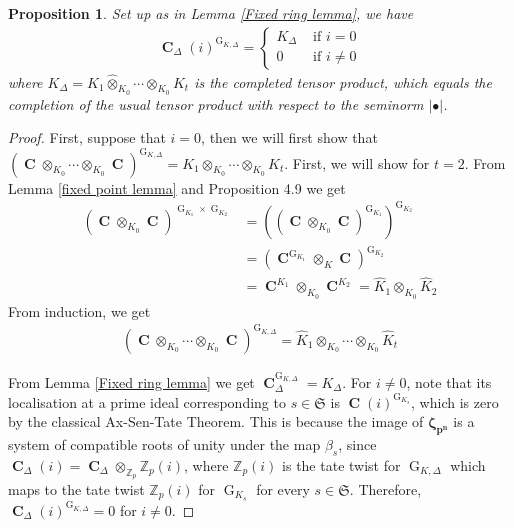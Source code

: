 \documentclass{amsart}
\newtheorem{proposition}{Proposition}[section]
\newcommand{\bn}{\textbf{n}}
\newcommand{\bp}{\textbf{p}}
\DeclareMathOperator{\C}{\textbf{C}}
\DeclareMathOperator{\G}{G}
\begin{document}
\begin{proposition}\label{Multivariate Tate-Sen Theorem}
    Set up as in Lemma \ref{Fixed ring lemma}, we have
    \begin{align*}
        \C_{\Delta}(i)^{\G_{K,\Delta}}=
        \begin{cases}
            K_\Delta & \text{ if } i=0\\
            0 & \text{ if } i\neq 0
        \end{cases}
    \end{align*}
    where $K_\Delta=K_1\widehat{\otimes}_{K_0}\cdots\widehat{\otimes}_{K_0}K_t$ is the completed tensor product, which equals the completion of the usual tensor product with respect to the seminorm $|\bullet|$.
\end{proposition}

\begin{proof}
   First, suppose that $i=0$, then we will first show that $(\C\otimes_{K_0}\cdots{\otimes}_{K_0}\C)^{\G_{K,\Delta}}=K_1\otimes_{K_0}\cdots\otimes_{K_0}K_t$. First, we will show for $t=2$. From Lemma \ref{fixed point lemma} and \cite{Fontaine} Proposition 4.9 we get
   \begin{align*}
       (\C\otimes_{K_0}\C)^{\G_{K_1}\times\G_{K_2}}&=\left((\C\otimes_{K_0}\C)^{\G_{K_1}}\right)^{\G_{K_2}}\\
                        &=(\C^{\G_{K_1}}\otimes_{K}\C)^{\G_{K_2}}\\
                        &=\C^{K_1}\otimes_{K_0}\C^{K_2}=\hat{K}_1\otimes_{K_0}\hat{K}_2
   \end{align*}
   From induction, we get
   \begin{align*}
       (\C\otimes_{K_0}\cdots\otimes_{K_0}\C)^{\G_{K,\Delta}}=\widehat{K}_1\otimes_{K_0}\cdots\otimes_{K_0}\hat{K}_t
   \end{align*}

    From Lemma \ref{Fixed ring lemma} we get $\C^{\G_{K,\Delta}}_{\Delta}=K_\Delta$.
    For $i\neq 0$, note that its localisation at a prime ideal corresponding to $s\in\mathfrak{S}$ is $\C(i)^{\G_{K_s}}$, which is zero by the classical Ax-Sen-Tate Theorem. This is because the image of $\boldsymbol{\zeta}_{\bp^\bn}$ is a system of compatible roots of unity under the map $\beta_s$, since $\C_\Delta(i)=\C_\Delta\otimes_{\mathbb{Z}_p}\mathbb{Z}_p(i)$, where $\mathbb{Z}_p(i)$ is the tate twist for $\G_{K,\Delta}$ which maps to the tate twist $\mathbb{Z}_p(i)$ for $\G_{K_s}$ for every $s\in\mathfrak{S}$. Therefore, $\C_\Delta(i)^{\G_{K,\Delta}}=0$ for $i\neq 0$.
\end{proof}
\end{document}

